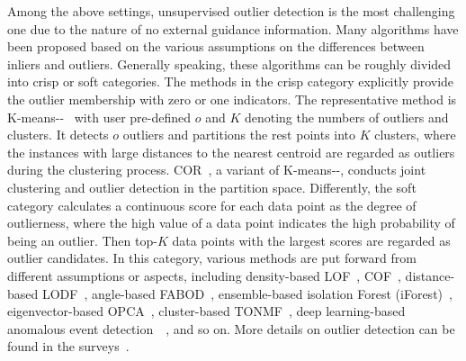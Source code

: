 \documentclass[sigconf,nonacm]{acmart}
\begin{document}
Among the above settings, unsupervised outlier detection is the most challenging one due to the nature of no external guidance information. Many algorithms have been proposed based on the various assumptions on the differences between inliers and outliers. Generally speaking, these algorithms can be roughly divided into crisp or soft categories. The methods in the crisp category explicitly provide the outlier membership with zero or one indicators. The representative method is K-means{-}{-}~\textcolor{gray}{\cite{chawla2013k}} with user pre-defined $o$ and $K$ denoting the numbers of outliers and clusters. It detects $o$ outliers and partitions the rest points into $K$ clusters, where the instances with large distances to the nearest centroid are regarded as outliers during the clustering process. COR~\textcolor{gray}{\cite{liu2019clustering}}, a variant of K-means{-}{-}, conducts joint clustering and outlier detection in the partition space. Differently, the soft category calculates a continuous score for each data point as the degree of outlierness, where the high value of a data point indicates the high probability of being an outlier. Then top-$K$ data points with the largest scores are regarded as outlier candidates. In this category, various methods are put forward from different assumptions or aspects, including density-based LOF~\textcolor{gray}{\cite{Breunig00SIR}}, COF~\textcolor{gray}{\cite{Tang02PKDD}}, distance-based LODF~\textcolor{gray}{\cite{Zhang09PKDD}}, angle-based FABOD~\textcolor{gray}{\cite{pham2012near}}, ensemble-based isolation Forest (iForest)~\textcolor{gray}{\cite{LiuFei2008}}, eigenvector-based OPCA~\textcolor{gray}{\cite{lee2012anomaly}}, cluster-based TONMF~\textcolor{gray}{\cite{Kannan17SDM}}, deep learning-based anomalous
event detection~~\textcolor{gray}{\cite{xu2015learning}}, and so on. More details on outlier detection can be found in the surveys~\textcolor{gray}{\cite{gupta2014outlier,agrawal2015survey}}. 
\end{document}
